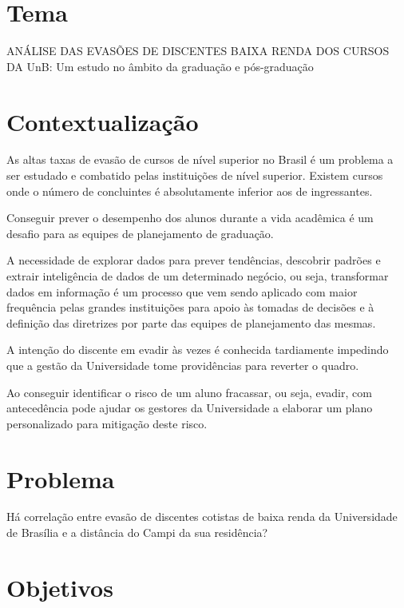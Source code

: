 \section{Tema}%
ANÁLISE DAS EVASÕES DE DISCENTES BAIXA RENDA DOS CURSOS DA UnB: Um estudo no âmbito da graduação e pós-graduação

\section{Contextualização}%

As altas taxas de evasão de cursos de nível superior no Brasil é um problema a ser estudado e combatido pelas instituições de nível superior. Existem cursos onde o  número de concluintes é absolutamente inferior aos de ingressantes. 

Conseguir prever o desempenho dos alunos durante a vida acadêmica é um desafio para as equipes de planejamento de graduação. 

A necessidade de explorar dados para prever tendências, descobrir padrões e extrair inteligência de dados de um determinado negócio, ou seja, transformar dados em informação é um processo que vem sendo aplicado com  maior frequência pelas grandes instituições para apoio às tomadas de decisões e à definição das diretrizes por parte das equipes de planejamento das mesmas.

A intenção do discente em evadir às vezes é conhecida tardiamente impedindo que a gestão da Universidade tome providências para reverter o quadro.

Ao conseguir identificar o risco de um aluno fracassar, ou seja, evadir, com antecedência pode ajudar os gestores da Universidade a elaborar um plano personalizado para mitigação deste risco.

\section{Problema}%

Há correlação entre evasão de discentes cotistas de baixa renda da Universidade de Brasília e a distância do Campi da sua residência?
\section{Objetivos}%


